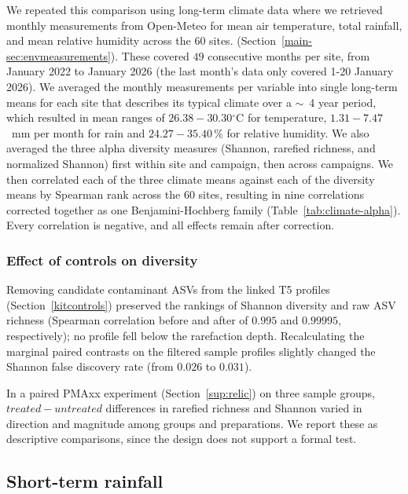 \documentclass[11pt]{article}
\begin{document}
We repeated this comparison using long-term climate data where we retrieved monthly measurements from Open-Meteo for mean air temperature, total rainfall, and mean relative humidity across the $60$ sites. (Section~\ref{main-sec:envmeasurements}). These covered $49$ consecutive months per site, from January 2022 to January 2026 (the last month’s data only covered 1-20 January 2026). We averaged the monthly measurements per variable into single long-term means for each site that describes its typical climate over a $\sim$~4 year period, which resulted in mean ranges of $26.38-30.30$$^{\circ}$C for temperature, $1.31-7.47$~mm per month for rain and $24.27-35.40\,\%$ for relative humidity. We also averaged the three alpha diversity measures (Shannon, rarefied richness, and normalized Shannon) first within site and campaign, then across campaigns. We then correlated each of the three climate means against each of the diversity means by Spearman rank across the $60$ sites, resulting in nine correlations corrected together as one Benjamini-Hochberg family (Table~\ref{tab:climate-alpha}). Every correlation is negative, and all effects remain after correction.


\subsubsection{Effect of controls on diversity}
Removing candidate contaminant ASVs from the linked T5 profiles (Section~\ref{kitcontrols}) preserved the rankings of Shannon diversity and raw ASV richness (Spearman correlation before and after of $0.995$ and $0.99995$, respectively); no profile fell below the rarefaction depth. Recalculating the marginal paired contrasts on the filtered sample profiles slightly changed the Shannon false discovery rate (from $0.026$ to $0.031$).

In a paired PMAxx experiment (Section~\ref{sup:relic}) on three sample groups, $treated - untreated$ differences in rarefied richness and Shannon varied in direction and magnitude among groups and preparations. We report these as descriptive comparisons, since the design does not support a formal test.


\subsection{Short-term rainfall}\label{sup:rainfall}
\end{document}

